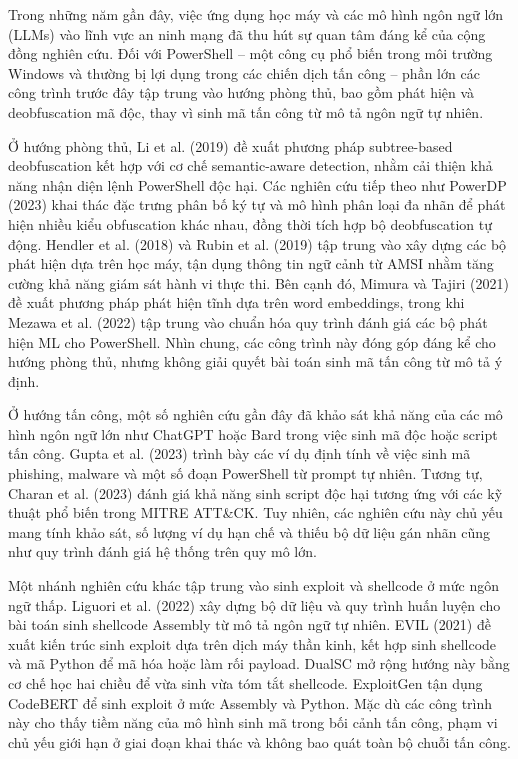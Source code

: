 Trong những năm gần đây, việc ứng dụng học máy và các mô hình ngôn ngữ lớn (LLMs) vào lĩnh vực an ninh mạng đã thu hút sự quan tâm đáng kể của cộng đồng nghiên cứu. Đối với PowerShell – một công cụ phổ biến trong môi trường Windows và thường bị lợi dụng trong các chiến dịch tấn công – phần lớn các công trình trước đây tập trung vào hướng phòng thủ, bao gồm phát hiện và deobfuscation mã độc, thay vì sinh mã tấn công từ mô tả ngôn ngữ tự nhiên.

Ở hướng phòng thủ, Li et al. (2019) đề xuất phương pháp subtree-based deobfuscation kết hợp với cơ chế semantic-aware detection, nhằm cải thiện khả năng nhận diện lệnh PowerShell độc hại. Các nghiên cứu tiếp theo như PowerDP (2023) khai thác đặc trưng phân bố ký tự và mô hình phân loại đa nhãn để phát hiện nhiều kiểu obfuscation khác nhau, đồng thời tích hợp bộ deobfuscation tự động. Hendler et al. (2018) và Rubin et al. (2019) tập trung vào xây dựng các bộ phát hiện dựa trên học máy, tận dụng thông tin ngữ cảnh từ AMSI nhằm tăng cường khả năng giám sát hành vi thực thi. Bên cạnh đó, Mimura và Tajiri (2021) đề xuất phương pháp phát hiện tĩnh dựa trên word embeddings, trong khi Mezawa et al. (2022) tập trung vào chuẩn hóa quy trình đánh giá các bộ phát hiện ML cho PowerShell. Nhìn chung, các công trình này đóng góp đáng kể cho hướng phòng thủ, nhưng không giải quyết bài toán sinh mã tấn công từ mô tả ý định.

Ở hướng tấn công, một số nghiên cứu gần đây đã khảo sát khả năng của các mô hình ngôn ngữ lớn như ChatGPT hoặc Bard trong việc sinh mã độc hoặc script tấn công. Gupta et al. (2023) trình bày các ví dụ định tính về việc sinh mã phishing, malware và một số đoạn PowerShell từ prompt tự nhiên. Tương tự, Charan et al. (2023) đánh giá khả năng sinh script độc hại tương ứng với các kỹ thuật phổ biến trong MITRE ATT\&CK. Tuy nhiên, các nghiên cứu này chủ yếu mang tính khảo sát, số lượng ví dụ hạn chế và thiếu bộ dữ liệu gán nhãn cũng như quy trình đánh giá hệ thống trên quy mô lớn.

Một nhánh nghiên cứu khác tập trung vào sinh exploit và shellcode ở mức ngôn ngữ thấp. Liguori et al. (2022) xây dựng bộ dữ liệu và quy trình huấn luyện cho bài toán sinh shellcode Assembly từ mô tả ngôn ngữ tự nhiên. EVIL (2021) đề xuất kiến trúc sinh exploit dựa trên dịch máy thần kinh, kết hợp sinh shellcode và mã Python để mã hóa hoặc làm rối payload. DualSC mở rộng hướng này bằng cơ chế học hai chiều để vừa sinh vừa tóm tắt shellcode. ExploitGen tận dụng CodeBERT để sinh exploit ở mức Assembly và Python. Mặc dù các công trình này cho thấy tiềm năng của mô hình sinh mã trong bối cảnh tấn công, phạm vi chủ yếu giới hạn ở giai đoạn khai thác và không bao quát toàn bộ chuỗi tấn công.

